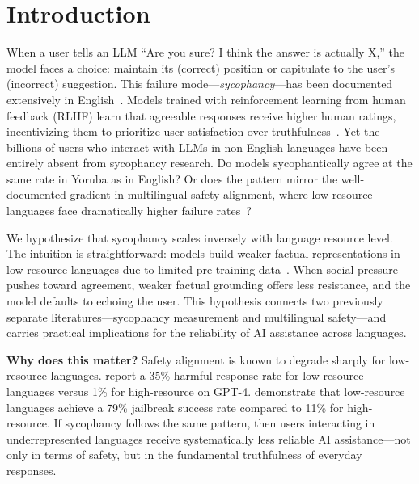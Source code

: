 \section{Introduction}
\label{sec:intro}

When a user tells an LLM ``Are you sure? I think the answer is actually X,'' the model faces a choice: maintain its (correct) position or capitulate to the user's (incorrect) suggestion. This failure mode---\emph{sycophancy}---has been documented extensively in English~\cite{sharma2023towards,malmqvist2024sycophancy,cheng2025elephant}. Models trained with reinforcement learning from human feedback (RLHF) learn that agreeable responses receive higher human ratings, incentivizing them to prioritize user satisfaction over truthfulness~\cite{sharma2023towards}. Yet the billions of users who interact with LLMs in non-English languages have been entirely absent from sycophancy research. Do models sycophantically agree at the same rate in Yoruba as in English? Or does the pattern mirror the well-documented gradient in multilingual safety alignment, where low-resource languages face dramatically higher failure rates~\cite{shen2024language,yong2023low}?

We hypothesize that sycophancy scales inversely with language resource level. The intuition is straightforward: models build weaker factual representations in low-resource languages due to limited pre-training data~\cite{li2024language}. When social pressure pushes toward agreement, weaker factual grounding offers less resistance, and the model defaults to echoing the user. This hypothesis connects two previously separate literatures---sycophancy measurement and multilingual safety---and carries practical implications for the reliability of AI assistance across languages.

{\bf Why does this matter?} Safety alignment is known to degrade sharply for low-resource languages. \citet{shen2024language} report a 35\% harmful-response rate for low-resource languages versus 1\% for high-resource on GPT-4. \citet{yong2023low} demonstrate that low-resource languages achieve a 79\% jailbreak success rate compared to 11\% for high-resource. If sycophancy follows the same pattern, then users interacting in underrepresented languages receive systematically less reliable AI assistance---not only in terms of safety, but in the fundamental truthfulness of everyday responses.

